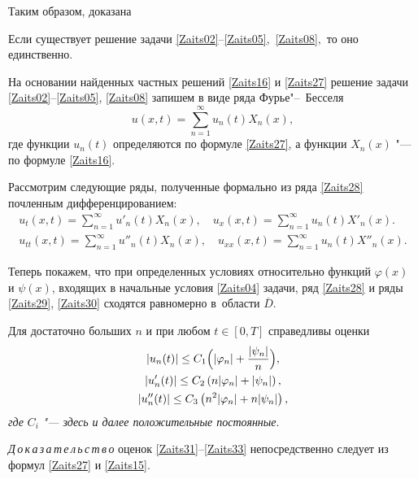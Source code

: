 Таким образом, доказана
\smallskip
\begin{theorem}[1]Если существует решение задачи \eqref{Zaits02}--\eqref{Zaits05}$,$ \eqref{Zaits08}$,$ то оно единственно\rm.
\end{theorem}

\smallskip


На основании найденных частных решений \eqref{Zaits16} и \eqref{Zaits27} решение задачи \eqref{Zaits02}--\eqref{Zaits05}, \eqref{Zaits08} запишем в виде ряда Фурье"--~Бесселя
\begin{equation}
\label{Zaits28}
u(x,t)=\sum\limits_{n=1}^\infty u_n(t)X_n(x),
\end{equation}
где функции $u_n(t)$ определяются по формуле \eqref{Zaits27}, а функции $X_n(x)$ "--- по формуле \eqref{Zaits16}.

Рассмотрим следующие ряды, полученные формально из ряда \eqref{Zaits28} почленным дифференцированием:
\begin{gather}
\label{Zaits29}
u_t(x,t)=\sum\limits_{n=1}^\infty u'_n(t)X_n(x),\quad u_x(x,t)=\sum\limits_{n=1}^\infty u_n(t)X'_n(x).
\\
\label{Zaits30}
u_{tt}(x,t)=\sum\limits_{n=1}^\infty u''_n(t)X_n(x),\quad u_{xx}(x,t)=\sum\limits_{n=1}^\infty u_n(t)X''_n(x).
\end{gather}

Теперь покажем, что при определенных условиях относительно функций $\varphi(x)$ и $\psi(x)$, входящих в начальные условия \eqref{Zaits04} задачи, ряд \eqref{Zaits28} и ряды \eqref{Zaits29}, \eqref{Zaits30} сходятся равномерно в~области $\overline{D}$.

\smallskip

\hypertarget{zay:l1}{}

\begin{lemma}[1]Для достаточно больших $n$ и при любом $t\in[0, T]$ справедливы оценки
\begin{gather}
\label{Zaits31}
|u_n(t)|\leq C_1\Bigl(|\varphi_n|+\frac{|\psi_n|}{n}\Bigr),
\\
\label{Zaits33}
|u'_n(t)|\leq C_2\left(n|\varphi_n|+|\psi_n|\right),
\\
\label{Zaits33}
|u''_n(t)|\leq C_3\left(n^2|\varphi_n|+n|\psi_n|\right),
\end{gather}
{\it где} $C_i$ {\it "--- здесь и далее положительные постоянные}.
\end{lemma}

\smallskip

\textit{Д\,о\,к\,а\,з\,а\,т\,е\,л\,ь\,с\,т\,в\,о\/} оценок \eqref{Zaits31}--\eqref{Zaits33} непосредственно следует из формул \eqref{Zaits27} и \eqref{Zaits15}.

